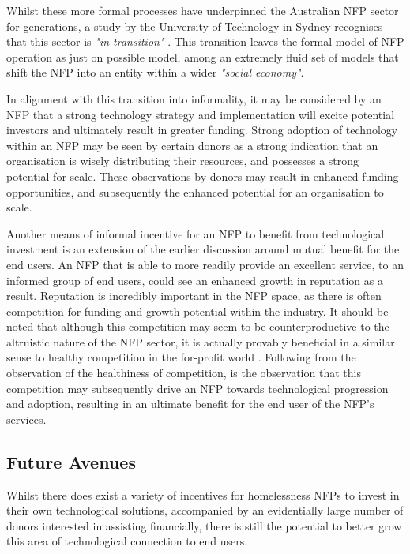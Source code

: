 Whilst these more formal processes have underpinned the Australian NFP sector for generations, a study by the University of Technology in Sydney recognises that this sector is \emph{"in transition"} \cite{logue2014emergence}. This transition leaves the formal model of NFP operation as just on possible model, among an extremely fluid set of models that shift the NFP into an entity within a wider \emph{"social economy"}. 

In alignment with this transition into informality, it may be considered by an NFP that a strong technology strategy and implementation will excite potential investors and ultimately result in greater funding. Strong adoption of technology within an NFP may be seen by certain donors as a strong indication that an organisation is wisely distributing their resources, and possesses a strong potential for scale. These observations by donors may result in enhanced funding opportunities, and subsequently the enhanced potential for an organisation to scale.

Another means of informal incentive for an NFP to benefit from technological investment is an extension of the earlier discussion around mutual benefit for the end users. An NFP that is able to more readily provide an excellent service, to an informed group of end users, could see an enhanced growth in reputation as a result. Reputation is incredibly important in the NFP space, as there is often competition for funding and growth potential within the industry. It should be noted that although this competition may seem to be counterproductive to the altruistic nature of the NFP sector, it is actually provably beneficial in a similar sense to healthy competition in the for-profit world \cite{philipson2009antitrust}. Following from the observation of the healthiness of competition, is the observation that this competition may subsequently drive an NFP towards technological progression and adoption, resulting in an ultimate benefit for the end user of the NFP's services.

\subsection{Future Avenues}

Whilst there does exist a variety of incentives for homelessness NFPs to invest in their own technological solutions, accompanied by an evidentially large number of donors interested in assisting financially, there is still the potential to better grow this area of technological connection to end users.


